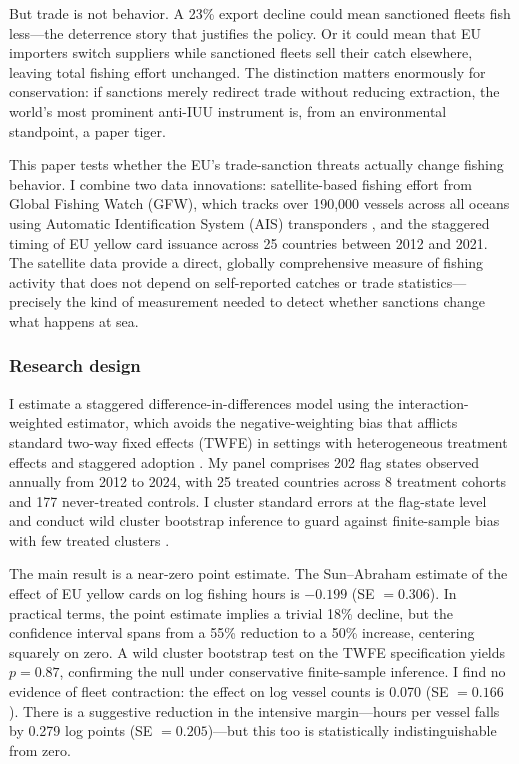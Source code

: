 \documentclass[12pt]{article}
\begin{document}
But trade is not behavior. A 23\% export decline could mean sanctioned fleets fish less---the deterrence story that justifies the policy. Or it could mean that EU importers switch suppliers while sanctioned fleets sell their catch elsewhere, leaving total fishing effort unchanged. The distinction matters enormously for conservation: if sanctions merely redirect trade without reducing extraction, the world's most prominent anti-IUU instrument is, from an environmental standpoint, a paper tiger.

This paper tests whether the EU's trade-sanction threats actually change fishing behavior. I combine two data innovations: satellite-based fishing effort from Global Fishing Watch (GFW), which tracks over 190,000 vessels across all oceans using Automatic Identification System (AIS) transponders \citep{kroodsma2018tracking}, and the staggered timing of EU yellow card issuance across 25 countries between 2012 and 2021. The satellite data provide a direct, globally comprehensive measure of fishing activity that does not depend on self-reported catches or trade statistics---precisely the kind of measurement needed to detect whether sanctions change what happens at sea.

\subsubsection*{Research design} I estimate a staggered difference-in-differences model using the \citet{sun2021estimating} interaction-weighted estimator, which avoids the negative-weighting bias that afflicts standard two-way fixed effects (TWFE) in settings with heterogeneous treatment effects and staggered adoption \citep{goodmanbacon2021difference}. My panel comprises 202 flag states observed annually from 2012 to 2024, with 25 treated countries across 8 treatment cohorts and 177 never-treated controls. I cluster standard errors at the flag-state level and conduct wild cluster bootstrap inference to guard against finite-sample bias with few treated clusters \citep{cameron2008bootstrap, roodman2019fast}.

The main result is a near-zero point estimate. The Sun--Abraham estimate of the effect of EU yellow cards on log fishing hours is $-0.199$ (SE $= 0.306$). In practical terms, the point estimate implies a trivial 18\% decline, but the confidence interval spans from a 55\% reduction to a 50\% increase, centering squarely on zero. A wild cluster bootstrap test on the TWFE specification yields $p = 0.87$, confirming the null under conservative finite-sample inference. I find no evidence of fleet contraction: the effect on log vessel counts is 0.070 (SE $= 0.166$). There is a suggestive reduction in the intensive margin---hours per vessel falls by 0.279 log points (SE $= 0.205$)---but this too is statistically indistinguishable from zero.
\end{document}
